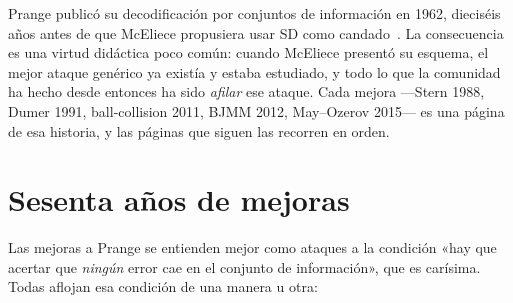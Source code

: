 \documentclass[11pt,a4paper,oneside]{report}
\begin{document}
\begin{historia}
Prange publicó su decodificación por conjuntos de información en
1962, dieciséis años antes de que McEliece propusiera usar SD como
candado~\cite{prange1962,mceliece1978}. La consecuencia es una virtud
didáctica poco común: cuando McEliece presentó su esquema, el mejor
ataque genérico ya existía y estaba estudiado, y todo lo que la
comunidad ha hecho desde entonces ha sido \emph{afilar} ese ataque.
Cada mejora ---Stern 1988, Dumer 1991, ball-collision 2011,
BJMM 2012, May--Ozerov 2015--- es una página de esa historia, y las
páginas que siguen las recorren en orden.
\end{historia}

\section{Sesenta años de mejoras}

Las mejoras a Prange se entienden mejor como ataques a la condición
«hay que acertar que \emph{ningún} error cae en el conjunto de
información», que es carísima. Todas aflojan esa condición de una
manera u otra:
\end{document}
